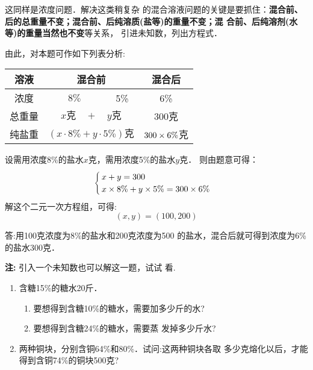 \begin{analyze}
这同样是浓度问题．解决这类稍复杂
的混合溶液问题的关键是要抓住：\textbf{混合前、后的总重量不变；混合前、后纯溶质(盐等)的重量不变；混
合前、后纯溶剂(水等)的重量当然也不变}等关系，
引进未知数，列出方程式．

    由此，对本题可作如下列表分析:
\begin{center}
\begin{tabular}{|c|c|c|c|}
\hline
溶液  & \multicolumn{2}{c|}{混合前} &混合后\\
\hline
浓度 & $\quad8\%\quad$  & 5\% & 6\%\\
\hline
总重量& \multicolumn{2}{c|}{$x\text{克}\quad +\quad y\text{克}$} &300克\\
\hline
纯盐重  & \multicolumn{2}{c|}{$(x\cdot 8\%+y\cdot 5\%)\text{克}$} &$300\times 6\%$克\\
\hline
\end{tabular}
\end{center}
 \end{analyze}


\begin{solution}
设需用浓度8\%的盐水$x$克，需用浓度5\%的盐水$y$克．
    则由题意可得：
\[\begin{cases}
    x+y=300\\
    x\times 8\% +y\times 5\%=300\times 6\%
\end{cases}\]
    解这个二元一次方程组，可得:
           \[(x,y)=(100,200) \]

    答:用100克浓度为8\%的盐水和200克浓度为500
的盐水，混合后就可得到浓度为6\%的盐水300克．

\textbf{注:} 引入一个未知数也可以解这一题，试试
看.
    
\end{solution}

\begin{ex}
\begin{enumerate}
    \item 含糖15\%的糖水20斤．
    \begin{enumerate}
        \item 要想得到含糖10\%的糖水，需要加多少斤的水?
        \item 要想得到含糖24\%的糖水，需要蒸
发掉多少斤水?
    \end{enumerate} 
\item 两种铜块，分别含铜64\%和80\%．试问:这两种铜块各取
多少克熔化以后，才能得到含铜74\%的铜块500克?
\end{enumerate}
 \end{ex}



